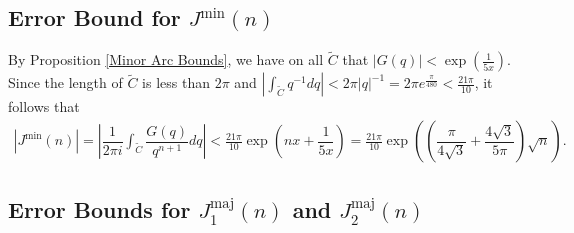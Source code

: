 \documentclass[11pt,reqno]{amsart}
\theoremstyle{definition}
\theoremstyle{plain}
\theoremstyle{named}
\numberwithin{equation}{section}
\theoremstyle{example}
\def\lp{\left(}
\def\rp{\right)}
\begin{document}
\subsection{Error Bound for $J^{\text{min}}(n)$}

By Proposition \ref{Minor Arc Bounds}, we have on all $\tilde C$ that $\left| G(q) \right| < \exp\lp \frac{1}{5x} \rp$. Since the length of $\widetilde C$ is less than $2\pi$ and $\left| \int_{\widetilde{C}} q^{-1} dq \right| < 2\pi |q|^{-1} = 2 \pi e^{\frac{\pi}{480}} < \frac{21\pi}{10}$, it follows that
\begin{align*}
    \left| J^{\text{min}}(n) \right| = \left| \dfrac{1}{2\pi i} \int_{\widetilde C} \dfrac{G(q)}{q^{n+1}} dq \right| < \frac{21\pi}{10} \exp\lp nx + \dfrac{1}{5x} \rp = \frac{21\pi}{10} \exp\lp \lp \dfrac{\pi}{4\sqrt{3}} + \dfrac{4\sqrt{3}}{5\pi} \rp \sqrt{n} \rp.
\end{align*}

\subsection{Error Bounds for $J_1^{\text{maj}}(n)$ and $J_2^{\text{maj}}(n)$}
\end{document}
